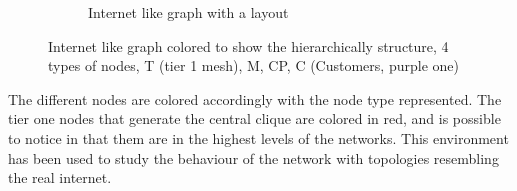 \begin{figure}[ht]
\begin{subfigure}[b]{0.37\textwidth}
		 \caption{Internet like graph with a  layout}
         \label{fig:internet_graph_hierarchical}
     \end{subfigure}
        \caption{Internet like graph colored to show the hierarchically structure,
4 types of nodes, T (tier 1 mesh), M, CP, C (Customers, purple one)}
        \label{fig:internet_graphs}
\end{figure}

The different nodes are colored accordingly with the node type represented.
The tier one nodes that generate the central clique are colored in red, and
is possible to notice in  that them are
in the highest levels of the networks.
This environment has been used to study the behaviour of the network with 
topologies resembling the real internet.
